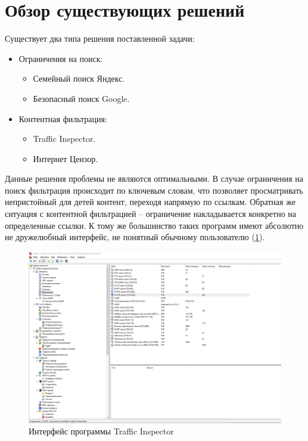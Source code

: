 \documentclass[14pt]{matmex-diploma}
\begin{document}
\section{Обзор существующих решений}

        Существует два типа решения поставленной задачи:
        
        \begin{itemize}
        	\item Ограничения на поиск:
        	    \begin{itemize}
        			\item Семейный поиск Яндекс.
        	    	\item Безопасный поиск Google.
        		\end{itemize}
        	\item Контентная фильтрация:
        	    \begin{itemize}
        	    	\item Traffic Inspector.
        	    	\item Интернет Цензор.
        	    \end{itemize}
        \end{itemize}
        
        Данные решения проблемы не являются оптимальными. В случае ограничения на поиск фильтрация происходит по ключевым словам, 
        что позволяет просматривать непристойный для детей контент, переходя напрямую по ссылкам. 
        Обратная же ситуация с контентной фильтрацией – ограничение накладывается конкретно на определенные ссылки. 
        К тому же большинство таких программ имеют абсолютно не дружелюбный интерфейс, не понятный обычному пользователю (\ref{bad}).
        
        \begin{figure}[h]
            \centering
        	\includegraphics[scale=0.4]{images/bad_interface.png}
        	\caption{Интерфейс программы Traffic Inspector}
        	\label{bad}
        \end{figure}    
\end{document}
